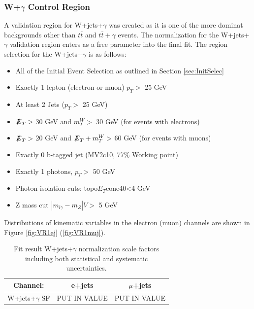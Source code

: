 \subsubsection{W+$\gamma$ Control Region}
A validation region for W+jets+$\gamma$ was created as it is one of the more dominat backgrounds other than $t\bar{t}$ and $t\bar{t}+\gamma$ events.  The normalization for the W+jets+$\gamma$ validation region enters as a free parameter into the final fit. The region selection for the W+jets+$\gamma$ is as follows:
\begin{itemize}
\item All of the Initial Event Selection as outlined in Section \ref{sec:InitSelec}
\item Exactly 1 lepton (electron or muon) $p_T >$ 25 GeV
\item At least 2 Jets  ($p_T >$ 25 GeV) 
\item $\slashed{E}_T >$ 30 GeV and $m_T^W >$ 30 GeV (for events with electrons)
\item $\slashed{E}_T >$ 20 GeV and $\slashed{E}_T + m_T^W >$ 60 GeV (for events with muons)
\item Exactly 0 b-tagged jet (MV2c10, 77\% Working point)
\item Exactly 1 photons, $p_T >$ 50 GeV
\item Photon isolation cuts: topo$E_T$cone40<4 GeV
\item Z mass cut $|m_{l\gamma}-m_Z|V>$ 5 GeV
\end{itemize}

Distributions of kinematic variables in the electron (muon) channels are shown in Figure \ref{fig:VR1ej} (\ref{fig:VR1muj}).
\begin{table}[h]
\begin{center}
{\renewcommand{\arraystretch}{1.2}
\begin{tabular}{c|c|c}
\hline
Channel:     &  e+jets   & $\mu$+jets  \\  \hline 
W+jets+$\gamma$ SF    &  PUT IN VALUE   & PUT IN VALUE	\\ \hline  %
\end{tabular}
\caption{Fit result W+jets+$\gamma$ normalization scale factors including both statistical and systematic uncertainties.  }
\label{tab:VR1SFs} 
}
\end{center}
\end{table}

